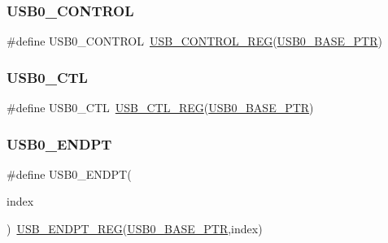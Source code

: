\subsubsection{\texorpdfstring{U\+S\+B0\+\_\+\+C\+O\+N\+T\+R\+OL}{USB0\_CONTROL}}
{\footnotesize\ttfamily \#define U\+S\+B0\+\_\+\+C\+O\+N\+T\+R\+OL~\hyperlink{group___u_s_b___register___accessor___macros_gae70ee8839acefd0aeb3e0c5129b59c76}{U\+S\+B\+\_\+\+C\+O\+N\+T\+R\+O\+L\+\_\+\+R\+EG}(\hyperlink{group___u_s_b___peripheral_ga598ff5eb20a0551af232710b3f27640a}{U\+S\+B0\+\_\+\+B\+A\+S\+E\+\_\+\+P\+TR})}

\mbox{\label{group___u_s_b___register___accessor___macros_ga9fd87834397651248f8b4be577821ff3}} 
\subsubsection{\texorpdfstring{U\+S\+B0\+\_\+\+C\+TL}{USB0\_CTL}}
{\footnotesize\ttfamily \#define U\+S\+B0\+\_\+\+C\+TL~\hyperlink{group___u_s_b___register___accessor___macros_gaf84a262dc6242d1a0f3b47186de660e7}{U\+S\+B\+\_\+\+C\+T\+L\+\_\+\+R\+EG}(\hyperlink{group___u_s_b___peripheral_ga598ff5eb20a0551af232710b3f27640a}{U\+S\+B0\+\_\+\+B\+A\+S\+E\+\_\+\+P\+TR})}

\mbox{\label{group___u_s_b___register___accessor___macros_gab12df1a4de08fae1e4662a2cb4060b5e}} 
\subsubsection{\texorpdfstring{U\+S\+B0\+\_\+\+E\+N\+D\+PT}{USB0\_ENDPT}}
{\footnotesize\ttfamily \#define U\+S\+B0\+\_\+\+E\+N\+D\+PT(\begin{DoxyParamCaption}\item[{}]{index }\end{DoxyParamCaption})~\hyperlink{group___u_s_b___register___accessor___macros_ga93e8b132ffc209ad3ba99ba2cbf4f990}{U\+S\+B\+\_\+\+E\+N\+D\+P\+T\+\_\+\+R\+EG}(\hyperlink{group___u_s_b___peripheral_ga598ff5eb20a0551af232710b3f27640a}{U\+S\+B0\+\_\+\+B\+A\+S\+E\+\_\+\+P\+TR},index)}

